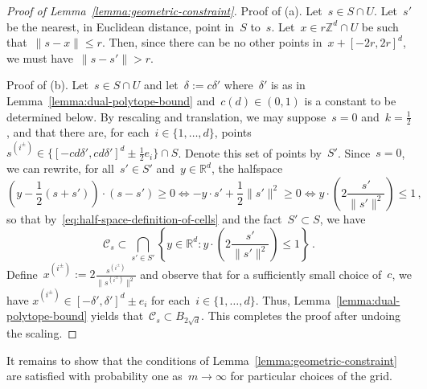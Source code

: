 \documentclass[12pt]{amsart}
\numberwithin{equation}{section}
\newcommand*{\Zd}{\ensuremath{\mathbb{Z}^d}}
\newcommand*{\Rd}{\ensuremath{\mathbb{R}^d}}
\begin{document}
\begin{proof}[Proof of Lemma~\ref{lemma:geometric-constraint}]
	Proof of (a). Let~$s \in S \cap U$. Let~$s'$ be the nearest, in Euclidean distance, point in~$S$ to~$s$. Let~$x \in r \Zd \cap U$ be such that~$\|s - x\| \leq r$. Then, since there can be no other points in~$x + [-2r, 2r]^d$, we must have~$\|s-s'\| > r$. 
	
	Proof of (b). Let~$s \in S \cap U$ and let~$\delta := c \delta'$ where~$\delta'$ is as in Lemma~\ref{lemma:dual-polytope-bound} and~$c(d) \in (0,1)$ is a constant to be determined below. By rescaling and translation, we may suppose~$s = 0$ and~$k = \frac12$, and that there are, for each~$i \in \{1, \ldots, d\}$, points~$s^{(i^{\pm})} \in \{[- c d \delta', cd   \delta']^d \pm \frac12 e_i\} \cap S$.
	Denote this set of points by~$S'$. Since~$s = 0$, we can rewrite, for all~$s' \in S'$ and~$y \in \Rd$, the halfspace
	  	\[
	  	 (y - \frac{1}{2}(s + s')) \cdot (s-s')  \geq 0 \iff - y \cdot s' + \frac12 \|s'\|^2 \geq 0 \iff y \cdot \left( 2 \frac{s'}{\|s'\|^2} \right) \leq 1 \,  ,
	  	\]
	  	so that by~\eqref{eq:half-space-definition-of-cells} and the fact~$S' \subset S$, we have
	\[
	\mathcal{C}_s \subset \bigcap_{s' \in S'} \left\{ y \in \Rd: y \cdot \left( 2 \frac{s'}{\|s'\|^2} \right) \leq 1  \right\} \, . 
	\]
	Define~$x^{(i^{\pm})} := 2 \frac{s^{(i^{\pm})}}{\|s^{(i^{\pm})}\|^2}$ and observe that for a sufficiently small choice of~$c$, we have $x^{(i^{\pm})} \in [-\delta', \delta']^d \pm e_i$ for each~$i \in \{1, \ldots, d\}$. Thus, Lemma~\ref{lemma:dual-polytope-bound} yields that~$\mathcal{C}_s \subset B_{2\sqrt{d}}$.  This completes the proof after undoing the scaling.
\end{proof}

It remains to show that the conditions of Lemma~\ref{lemma:geometric-constraint} are satisfied with probability one  as~$m \to \infty$
for particular choices of the grid. 
\end{document}
